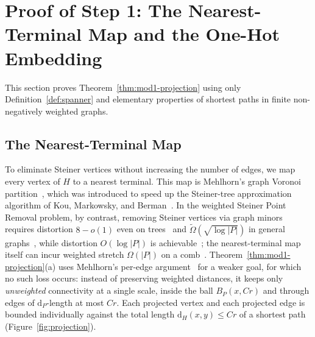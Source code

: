 \documentclass[11pt]{article}
\theoremstyle{definition}
\theoremstyle{remark}
\newcommand{\dH}{\mathrm{d}_H}
\newcommand{\dP}{\mathrm{d}_P}
\begin{document}
\section{Proof of Step 1: The Nearest-Terminal Map and the One-Hot Embedding}
\label{sec:projection}

This section proves Theorem~\ref{thm:mod1-projection} using only Definition~\ref{def:spanner} and elementary properties of shortest paths in finite non-negatively weighted graphs.

\subsection{The Nearest-Terminal Map}
\label{subsec:nearest-terminal}

To eliminate Steiner vertices without increasing the number of edges, we map every vertex of $H$ to a nearest terminal. This map is Mehlhorn's graph Voronoi partition~\cite{mehlhorn1988faster}, which was introduced to speed up the Steiner-tree approximation algorithm of Kou, Markowsky, and Berman~\cite{kou1981fast}. In the weighted Steiner Point Removal problem, by contrast, removing Steiner vertices via graph minors requires distortion $8 - o(1)$ even on trees~\cite{chan2006steiner} and $\tilde{\Omega}(\sqrt{\log |P|})$ in general graphs~\cite{chen2024lower}, while distortion $O(\log |P|)$ is achievable~\cite{filtser2019steiner}; the nearest-terminal map itself can incur weighted stretch $\Omega(|P|)$ on a comb~\cite{filtser2019steiner}. Theorem~\ref{thm:mod1-projection}(a) uses Mehlhorn's per-edge argument~\cite{mehlhorn1988faster} for a weaker goal, for which no such loss occurs: instead of preserving weighted distances, it keeps only \emph{unweighted} connectivity at a single scale, inside the ball $B_P(x, C r)$ and through edges of $\dP$-length at most $C r$. Each projected vertex and each projected edge is bounded individually against the total length $\dH(x, y) \le C r$ of a shortest path (Figure~\ref{fig:projection}).
\end{document}
